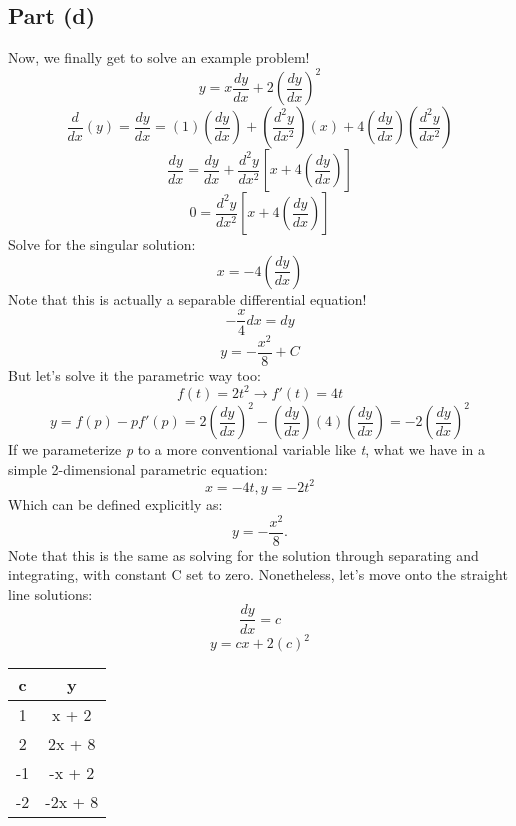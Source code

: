 \documentclass{article}
\begin{document}
\subsection{Part (d)}
Now, we finally get to solve an example problem!
\begin{equation}
y = x \frac{dy}{dx} + 2(\frac{dy}{dx})^2
\end{equation}
\begin{equation}
\frac{d}{dx}(y) = \frac{dy}{dx} = (1)(\frac{dy}{dx}) + (\frac{d^2y}{dx^2})(x) + 4(\frac{dy}{dx})(\frac{d^2y}{dx^2})
\end{equation}
\begin{equation}
\frac{dy}{dx} = \frac{dy}{dx} + \frac{d^2y}{dx^2}[x + 4(\frac{dy}{dx})]
\end{equation}
\begin{equation}
0 = \frac{d^2y}{dx^2}[x + 4(\frac{dy}{dx})]
\end{equation}
Solve for the singular solution:
\begin{equation}
x = -4(\frac{dy}{dx})
\end{equation}
Note that this is actually a separable differential equation!
\begin{equation}
-\frac{x}{4} dx = dy
\end{equation}
\begin{equation}
y = -\frac{x^2}{8} + C
\end{equation}
But let's solve it the parametric way too:
\begin{equation}
f(t) = 2t^2 \rightarrow f'(t) = 4t
\end{equation}
\begin{equation}
y = f(p) - pf'(p) = 2(\frac{dy}{dx})^2 - (\frac{dy}{dx})(4)(\frac{dy}{dx}) = -2(\frac{dy}{dx})^2
\end{equation}
If we parameterize \textit{p} to a more conventional variable like \textit{t}, what we have in a simple 2-dimensional parametric equation:
\begin{equation}
x = -4t, y= -2t^2
\end{equation}
Which can be defined explicitly as:
\begin{equation}
y = -\frac{x^2}{8}.
\end{equation}
Note that this is the same as solving for the solution through separating and integrating, with constant C set to zero. Nonetheless, let's move onto the straight line solutions:
\begin{equation}
\frac{dy}{dx} = c
\end{equation}
\begin{equation}
y = cx + 2(c)^2
\end{equation}
\begin{center}
\begin{tabular}{| c | c |}
\hline
c & y \\
\hline
 1 & x + 2  \\
 \hline
 2 & 2x + 8  \\
 \hline
 -1 & -x + 2  \\
 \hline
 -2 &  -2x + 8 \\
\hline
\end{tabular}
\end{center}
\end{document}

